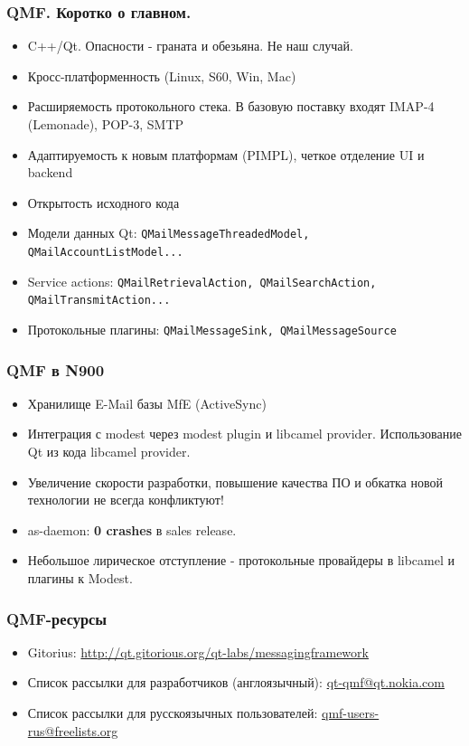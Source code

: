 \documentclass[compress,hyperref={linkcolor=blue,pdftex,unicode}]{beamer}
\newcommand{\myhref}[2]{\textcolor{blue}{\href{#1}{#2}}}
\begin{document}
\begin{frame}
\frametitle{QMF. Коротко о главном.}
\begin{itemize}
\item C++/Qt. Опасности - граната и обезьяна. Не наш случай.
\pause
\item Кросс-платформенность (Linux, S60, Win, Mac)
\pause
\item Расширяемость протокольного стека. В базовую поставку входят IMAP-4 (Lemonade), POP-3, SMTP
\pause
\item Адаптируемость к новым платформам (PIMPL), четкое отделение UI и backend
\pause
\item Открытость исходного кода
\pause
\item Модели данных Qt: \texttt{QMailMessageThreadedModel, QMailAccountListModel...}
\pause
\item Service actions:  \texttt{QMailRetrievalAction, QMailSearchAction, QMailTransmitAction...}
\pause
\item Протокольные плагины: \texttt{QMailMessageSink, QMailMessageSource}
\end{itemize}
\end{frame}

\begin{frame}
\frametitle{QMF в N900}
\begin{itemize}
\item Хранилище E-Mail базы MfE (ActiveSync)
\pause
\item Интеграция с modest через modest plugin и libcamel provider. Использование Qt из кода libcamel provider.
\pause
\item Увеличение скорости разработки, повышение качества ПО и обкатка новой технологии не всегда конфликтуют!
\pause
\item as-daemon: \textbf{0 crashes} в sales release.
\pause
\item Небольшое лирическое отступление - протокольные провайдеры в libcamel и плагины к Modest.
\end{itemize}
\end{frame}

\begin{frame}
\frametitle{QMF-ресурсы}
\begin{itemize}
\item Gitorius: \myhref{http://qt.gitorious.org/qt-labs/messagingframework}{http://qt.gitorious.org/qt-labs/messagingframework}
\pause
\item Список рассылки для разработчиков (англоязычный): \myhref{mailto:qt-qmf@qt.nokia.com}{qt-qmf@qt.nokia.com}
\pause
\item Список рассылки для русскоязычных пользователей: \myhref{mailto:qmf-users-rus@freelists.org}{qmf-users-rus@freelists.org}
\end{itemize}
\end{frame}
\end{document}
